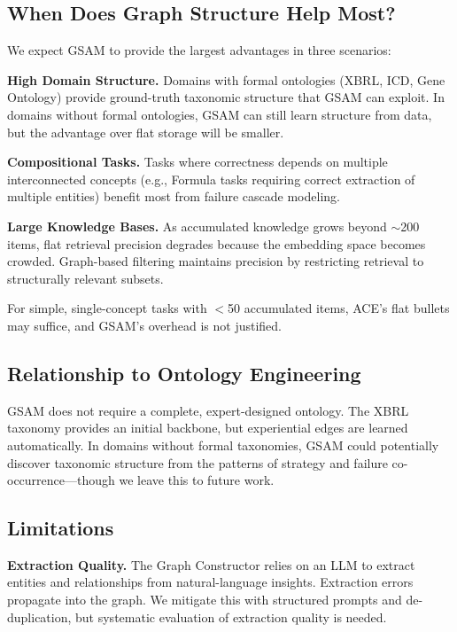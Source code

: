 \documentclass[12pt,a4paper]{article}
\begin{document}
\subsection{When Does Graph Structure Help Most?}

We expect GSAM to provide the largest advantages in three scenarios:

\textbf{High Domain Structure.} Domains with formal ontologies (XBRL, ICD, Gene Ontology) provide ground-truth taxonomic structure that GSAM can exploit. In domains without formal ontologies, GSAM can still learn structure from data, but the advantage over flat storage will be smaller.

\textbf{Compositional Tasks.} Tasks where correctness depends on multiple interconnected concepts (e.g., Formula tasks requiring correct extraction of multiple entities) benefit most from failure cascade modeling.

\textbf{Large Knowledge Bases.} As accumulated knowledge grows beyond $\sim$200 items, flat retrieval precision degrades because the embedding space becomes crowded. Graph-based filtering maintains precision by restricting retrieval to structurally relevant subsets.

For simple, single-concept tasks with $<$50 accumulated items, ACE's flat bullets may suffice, and GSAM's overhead is not justified.

\subsection{Relationship to Ontology Engineering}

GSAM does not require a complete, expert-designed ontology. The XBRL taxonomy provides an initial backbone, but experiential edges are learned automatically. In domains without formal taxonomies, GSAM could potentially discover taxonomic structure from the patterns of strategy and failure co-occurrence---though we leave this to future work.

\subsection{Limitations}

\textbf{Extraction Quality.} The Graph Constructor relies on an LLM to extract entities and relationships from natural-language insights. Extraction errors propagate into the graph. We mitigate this with structured prompts and de-duplication, but systematic evaluation of extraction quality is needed.
\end{document}
